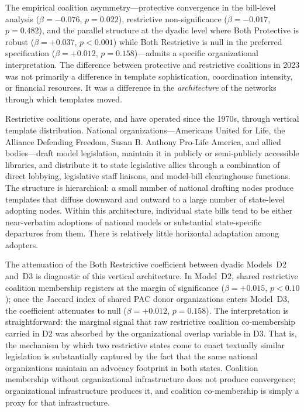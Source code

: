The empirical coalition asymmetry---protective convergence in the bill-level analysis ($\beta = -0.076$, $p = 0.022$), restrictive non-significance ($\beta = -0.017$, $p = 0.482$), and the parallel structure at the dyadic level where Both Protective is robust ($\beta = +0.037$, $p < 0.001$) while Both Restrictive is null in the preferred specification ($\beta = +0.012$, $p = 0.158$)---admits a specific organizational interpretation. The difference between protective and restrictive coalitions in 2023 was not primarily a difference in template sophistication, coordination intensity, or financial resources. It was a difference in the \emph{architecture} of the networks through which templates moved.

Restrictive coalitions operate, and have operated since the 1970s, through vertical template distribution. National organizations---Americans United for Life, the Alliance Defending Freedom, Susan B. Anthony Pro-Life America, and allied bodies---draft model legislation, maintain it in publicly or semi-publicly accessible libraries, and distribute it to state legislative allies through a combination of direct lobbying, legislative staff liaisons, and model-bill clearinghouse functions. The structure is hierarchical: a small number of national drafting nodes produce templates that diffuse downward and outward to a large number of state-level adopting nodes. Within this architecture, individual state bills tend to be either near-verbatim adoptions of national models or substantial state-specific departures from them. There is relatively little horizontal adaptation among adopters.

The attenuation of the Both Restrictive coefficient between dyadic Models~D2 and~D3 is diagnostic of this vertical architecture. In Model~D2, shared restrictive coalition membership registers at the margin of significance ($\beta = +0.015$, $p < 0.10$); once the Jaccard index of shared PAC donor organizations enters Model~D3, the coefficient attenuates to null ($\beta = +0.012$, $p = 0.158$). The interpretation is straightforward: the marginal signal that raw restrictive coalition co-membership carried in D2 was absorbed by the organizational overlap variable in D3. That is, the mechanism by which two restrictive states come to enact textually similar legislation is substantially captured by the fact that the same national organizations maintain an advocacy footprint in both states. Coalition membership without organizational infrastructure does not produce convergence; organizational infrastructure produces it, and coalition co-membership is simply a proxy for that infrastructure.

